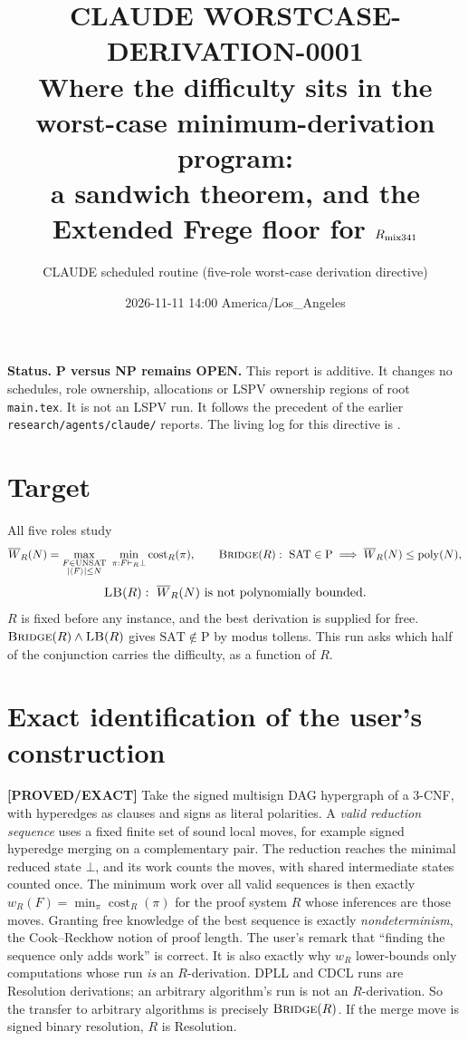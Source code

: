 \documentclass[11pt]{article}
\title{CLAUDE WORSTCASE-DERIVATION-0001\\[2pt]
\large Where the difficulty sits in the worst-case minimum-derivation program:\\
a sandwich theorem, and the Extended Frege floor for $R_{\mathrm{mix341}}$}
\author{CLAUDE scheduled routine (five-role worst-case derivation directive)}
\date{2026-11-11 14:00 America/Los\_Angeles}
\theoremstyle{remark}
\newcommand{\SAT}{\mathrm{SAT}}
\newcommand{\UNSAT}{\mathrm{UNSAT}}
\newcommand{\Wb}{\overline W}
\newcommand{\poly}{\operatorname{poly}}
\newcommand{\status}[1]{\textbf{[#1]}}
\begin{document}
\maketitle

\noindent\textbf{Status.} \textbf{P versus NP remains OPEN.} This report is additive. It
changes no schedules, role ownership, allocations or LSPV ownership regions of root
\texttt{main.tex}. It is not an LSPV run. It follows the precedent of the earlier
\texttt{research/agents/claude/} reports. The living log for this directive is
.

\section*{Target}
All five roles study
\[
\Wb_R(N)=\max_{\substack{F\in\UNSAT\\ |\langle F\rangle|\le N}}\ \min_{\pi:F\vdash_R\bot}\operatorname{cost}_R(\pi),
\qquad
\textsc{Bridge}(R):\ \SAT\in\mathrm P\implies \Wb_R(N)\le\poly(N),
\]
\[
\textsc{LB}(R):\ \Wb_R(N)\ \text{is not polynomially bounded}.
\]
$R$ is fixed before any instance, and the best derivation is supplied for free.
$\textsc{Bridge}(R)\wedge\textsc{LB}(R)$ gives $\SAT\notin\mathrm P$ by modus tollens.
This run asks which half of the conjunction carries the difficulty, as a function of $R$.

\section{Exact identification of the user's construction}
\status{PROVED/EXACT} Take the signed multisign DAG hypergraph of a 3-CNF, with
hyperedges as clauses and signs as literal polarities. A \emph{valid reduction sequence}
uses a fixed finite set of sound local moves, for example signed hyperedge merging on a
complementary pair. The reduction reaches the minimal reduced state $\bot$, and its work
counts the moves, with shared intermediate states counted once. The
minimum work over all valid sequences is then exactly $w_R(F)=\min_\pi\operatorname{cost}_R(\pi)$
for the proof system $R$ whose inferences are those moves. Granting free knowledge of the best
sequence is exactly \emph{nondeterminism}, the Cook--Reckhow notion of proof length. The
user's remark that ``finding the sequence only adds work'' is correct. It is also exactly why
$w_R$ lower-bounds only computations whose run \emph{is} an $R$-derivation. DPLL and CDCL runs
are Resolution derivations; an arbitrary algorithm's run is not an $R$-derivation. So the
transfer to arbitrary algorithms is precisely $\textsc{Bridge}(R)$. If the merge move is
signed binary resolution, $R$ is Resolution.
\end{document}
